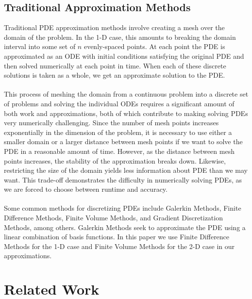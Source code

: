 \documentclass{article}
\begin{document}
\subsection{Traditional Approximation Methods}

Traditional PDE approximation methods involve creating a mesh over the domain of the problem. In the 1-D case, this amounts to breaking the domain interval into some set of $n$ evenly-spaced points. At each point the PDE is approximated as an ODE with initial conditions satisfying the original PDE and then solved numerically at each point in time. When each of these discrete solutions is taken as a whole, we get an approximate solution to the PDE. \\ \\
This process of meshing the domain from a continuous problem into a discrete set of problems and solving the individual ODEs requires a significant amount of both work and approximations, both of which contribute to making solving PDEs very numerically challenging. Since the number of mesh points increases exponentially in the dimension of the problem, it is necessary to use either a smaller domain or a larger distance between mesh points if we want to solve the PDE in a reasonable amount of time. However, as the distance between mesh points increases, the stability of the approximation breaks down. Likewise, restricting the size of the domain yields less information about PDE than we may want. This trade-off demonstrates the difficulty in numerically solving PDEs, as we are forced to choose between runtime and accuracy.\\ \\
Some common methods for discretizing PDEs include Galerkin Methods, Finite Difference Methods, Finite Volume Methods, and Gradient Discretization Methods, among others. Galerkin Methods seek to approximate the PDE using a linear combination of basis functions. In this paper we use Finite Difference Methods for the 1-D case and Finite Volume Methods for the 2-D case in our approximations.\\

\section{Related Work}
\end{document}

